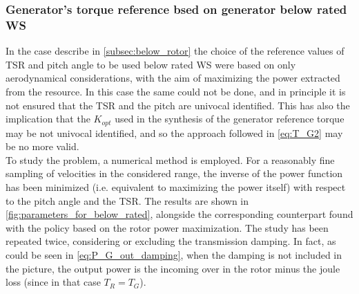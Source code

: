\subsubsection[Below rated WS]{Generator's torque reference bsed on generator below rated WS}
In the case describe in \autoref{subsec:below_rotor} the choice of the reference values of TSR and pitch angle to be used below rated WS were based on only aerodynamical considerations, with the aim of maximizing the power extracted from the resource. In this case the same could not be done, and in principle it is not ensured that the TSR and the pitch are univocal identified. This has also the implication that the $K_{opt}$ used in the synthesis of the generator reference torque may be not univocal identified, and so the approach followed in \autoref{eq:T_G2} may be no more valid. \\
To study the problem, a numerical method is employed. For a reasonably fine sampling of velocities in the considered range, the inverse of the power function has been minimized (i.e. equivalent to maximizing the power itself) with respect to the pitch angle and the TSR. The results are shown in \autoref{fig:parameters_for_below_rated}, alongside the corresponding counterpart found with the policy based on the rotor power maximization. The study has been repeated twice, considering or excluding the transmission damping. In fact, as could be seen in \autoref{eq:P_G_out_damping}, when the damping is not included in the picture, the output power is the incoming over in the rotor minus the joule loss (since in that case $T_R=T_G$).
